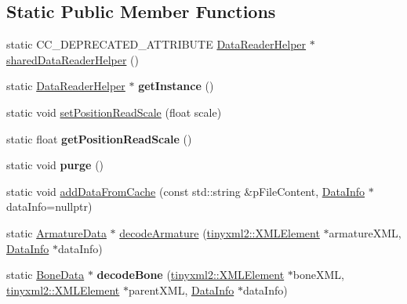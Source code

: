 \subsection*{Static Public Member Functions}
\begin{DoxyCompactItemize}
\item 
static C\+C\+\_\+\+D\+E\+P\+R\+E\+C\+A\+T\+E\+D\+\_\+\+A\+T\+T\+R\+I\+B\+U\+TE \hyperlink{classcocostudio_1_1DataReaderHelper}{Data\+Reader\+Helper} $\ast$ \hyperlink{classcocostudio_1_1DataReaderHelper_a9bb0d6d948d46a153a1d7cfe53e3c406}{shared\+Data\+Reader\+Helper} ()
\item 
\mbox{\label{classcocostudio_1_1DataReaderHelper_af0f1e7946782054b427e378a4ca6052f}} 
static \hyperlink{classcocostudio_1_1DataReaderHelper}{Data\+Reader\+Helper} $\ast$ {\bfseries get\+Instance} ()
\item 
static void \hyperlink{classcocostudio_1_1DataReaderHelper_a78e64a51e15233c34328a5c3f1ef47e5}{set\+Position\+Read\+Scale} (float scale)
\item 
\mbox{\label{classcocostudio_1_1DataReaderHelper_a81cd9ba61cff9d28159d3f900fae5f94}} 
static float {\bfseries get\+Position\+Read\+Scale} ()
\item 
\mbox{\label{classcocostudio_1_1DataReaderHelper_ad46a91c565166100591c0c76747c3e8c}} 
static void {\bfseries purge} ()
\item 
static void \hyperlink{classcocostudio_1_1DataReaderHelper_a4effa5f316747f7fedb3a839340de50a}{add\+Data\+From\+Cache} (const std\+::string \&p\+File\+Content, \hyperlink{structcocostudio_1_1DataReaderHelper_1_1__DataInfo}{Data\+Info} $\ast$data\+Info=nullptr)
\item 
static \hyperlink{classcocostudio_1_1ArmatureData}{Armature\+Data} $\ast$ \hyperlink{classcocostudio_1_1DataReaderHelper_a2311ecf502f9ce3a68fd5b14315db775}{decode\+Armature} (\hyperlink{classtinyxml2_1_1XMLElement}{tinyxml2\+::\+X\+M\+L\+Element} $\ast$armature\+X\+ML, \hyperlink{structcocostudio_1_1DataReaderHelper_1_1__DataInfo}{Data\+Info} $\ast$data\+Info)
\item 
\mbox{\label{classcocostudio_1_1DataReaderHelper_aa8c352a38f58cb964eebb49f1db768da}} 
static \hyperlink{classcocostudio_1_1BoneData}{Bone\+Data} $\ast$ {\bfseries decode\+Bone} (\hyperlink{classtinyxml2_1_1XMLElement}{tinyxml2\+::\+X\+M\+L\+Element} $\ast$bone\+X\+ML, \hyperlink{classtinyxml2_1_1XMLElement}{tinyxml2\+::\+X\+M\+L\+Element} $\ast$parent\+X\+ML, \hyperlink{structcocostudio_1_1DataReaderHelper_1_1__DataInfo}{Data\+Info} $\ast$data\+Info)

\end{DoxyCompactItemize}
